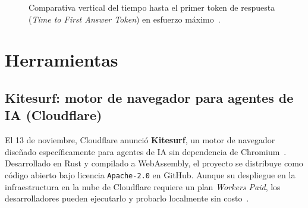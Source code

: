 \documentclass[conference,twocolumn,spanish]{IEEEtran}
\begin{document}
\begin{figure}[htbp]
\centering
{}
\caption{Comparativa vertical del tiempo hasta el primer token de respuesta (\textit{Time to First Answer Token}) en esfuerzo máximo~\cite{aa_index_2026}.}
\label{fig:aa_ttft_sem2}
\end{figure}

\section{Herramientas}

\subsection{Kitesurf: motor de navegador para agentes de IA (Cloudflare)}
El 13 de noviembre, Cloudflare anunció \textbf{Kitesurf}, un motor de navegador diseñado específicamente para agentes de IA sin dependencia de Chromium~\cite{cloudflare_kitesurf_2026,linuxiac_kitesurf_2026}. Desarrollado en Rust y compilado a WebAssembly, el proyecto se distribuye como código abierto bajo licencia \texttt{Apache-2.0} en GitHub. Aunque su despliegue en la infraestructura en la nube de Cloudflare requiere un plan \textit{Workers Paid}, los desarrolladores pueden ejecutarlo y probarlo localmente sin costo~\cite{cloudflare_kitesurf_2026}.
\end{document}
